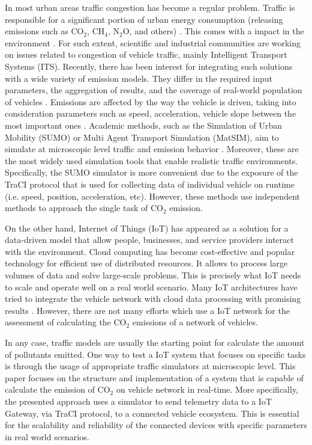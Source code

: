 \documentclass[letter, 10pt, conference]{ieeeconf}
\begin{document}
In most urban areas traffic congestion has become a regular problem.
Traffic is responsible for a significant portion of urban energy consumption (releasing emissions such as CO$_2$, CH$_4$, N$_2$O, and others) \cite{patterson_preparing_nodate}.
This comes with a impact in the environment \cite{karagiannis_vehicular_2011}.
For such extent, scientific and industrial communities are working on issues related to congestion of vehicle traffic, mainly Intelligent Transport Systems (ITS).
Recently, there has been interest for integrating such solutions with a wide variety of emission models.
They differ in the required input parameters, the aggregation of results, and the coverage of real-world population of vehicles \cite{hofer_large_2018}.
Emissions are affected by the way the vehicle is driven, taking into consideration parameters such as speed, acceleration, vehicle slope between the most important ones \cite{noauthor_intergovernmental_2001}.
Academic methods, such as the Simulation of Urban Mobility (SUMO) or Multi Agent Transport Simulation (MatSIM), aim to simulate at microscopic level traffic and emission behavior \cite{bazzan_multi-agent_2009}.
Moreover, these are the most widely used simulation tools that enable realistic traffic environments.
Specifically, the SUMO simulator is more convenient due to the exposure of the TraCI protocol that is used for collecting data of individual vehicle on runtime (i.e. speed, position, acceleration, etc).
However, these methods use independent methods to approach the single task of CO$_2$ emission.

On the other hand, Internet of Things (IoT) has appeared as a solution for a data-driven model that allow people, businesses, and service providers interact with the environment.
Cloud computing has become cost-effective and popular technology for efficient use of distributed resources.
It allows to process large volumes of data and solve large-scale problems.
This is precisely what IoT needs to scale and operate well on a real world scenario.
Many IoT architectures have tried to integrate the vehicle network with cloud data processing with promising results \cite{tarneberg_experiences_2016}.
However, there are not many efforts which use a IoT network for the assessment of calculating the CO$_2$ emissions of a network of vehicles.

In any case, traffic models are usually the starting point for calculate the amount of pollutants emitted.
One way to test a IoT system that focuses on specific tasks is through the usage of appropriate traffic simulators at microscopic level.
This paper focuses on the structure and implementation of a system that is capable of calculate the emission of CO$_2$ on vehicle network in real-time.
More specifically, the presented approach uses a simulator to send telemetry data to a IoT Gateway, via TraCI protocol, to a connected vehicle ecosystem.
This is essential for the scalability and reliability of the connected devices with specific parameters in real world scenarios.
\end{document}
